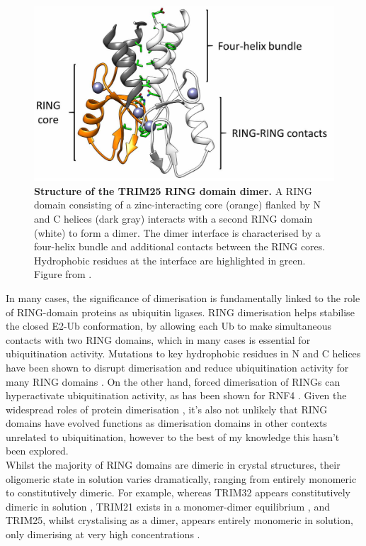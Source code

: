 \documentclass[12pt]{"report"}
\newcommand{\mycaption}[2]{\caption[#1]{\textbf{#1.} #2}}
\begin{document}
\begin{figure}
\includegraphics[scale=0.4]{trim25}
\mycaption{Structure of the TRIM25 RING domain dimer}{
A RING domain consisting of a zinc-interacting core (orange) flanked by N and C helices (dark gray) interacts with a second RING domain (white) to form a dimer. The dimer interface is characterised by a four-helix bundle and additional contacts between the RING cores. Hydrophobic residues at the interface are highlighted in green. Figure from \textcite{Fiorentini2020}.
}
\label{fig:trim25}
\end{figure}

In many cases, the significance of dimerisation is fundamentally linked to the  role of RING-domain proteins as ubiquitin ligases. RING dimerisation helps stabilise the closed E2-Ub conformation, by allowing each Ub to make simultaneous contacts with two RING domains, which in many cases is essential for ubiquitination activity. Mutations to key hydrophobic residues in N and C helices have been shown to disrupt dimerisation and reduce ubiquitination activity for many RING domains \citep{Koliopoulos2016, Rojas-Fernandez2014, Liew2010}. On the other hand, forced dimerisation of RINGs can hyperactivate ubiquitination activity, as has been shown for RNF4 \citep{Rojas-Fernandez2014}. Given the widespread roles of protein dimerisation \citep{Goodsell2000}, it's also not unlikely that RING domains have evolved functions as dimerisation domains in other contexts unrelated to ubiquitination, however to the best of my knowledge this hasn't been explored.\\

Whilst the majority of RING domains are dimeric in crystal structures, their oligomeric state in solution varies dramatically, ranging from entirely monomeric to constitutively dimeric. For example, whereas TRIM32 appears constitutively dimeric in solution \citep{Koliopoulos2016}, TRIM21 exists in a monomer-dimer equilibrium \citep{Dickson2018}, and TRIM25, whilst crystalising as a dimer, appears entirely monomeric in solution, only dimerising at very high concentrations \citep{Koliopoulos2016}. \\
\end{document}
